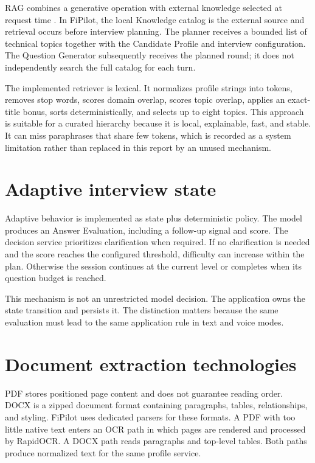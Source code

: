 RAG combines a generative operation with external knowledge selected at request time \cite{lewis2020rag}. In FiPilot, the local Knowledge catalog is the external source and retrieval occurs before interview planning. The planner receives a bounded list of technical topics together with the Candidate Profile and interview configuration. The Question Generator subsequently receives the planned round; it does not independently search the full catalog for each turn.

The implemented retriever is lexical. It normalizes profile strings into tokens, removes stop words, scores domain overlap, scores topic overlap, applies an exact-title bonus, sorts deterministically, and selects up to eight topics. This approach is suitable for a curated hierarchy because it is local, explainable, fast, and stable. It can miss paraphrases that share few tokens, which is recorded as a system limitation rather than replaced in this report by an unused mechanism.

\section{Adaptive interview state}

Adaptive behavior is implemented as state plus deterministic policy. The model produces an Answer Evaluation, including a follow-up signal and score. The decision service prioritizes clarification when required. If no clarification is needed and the score reaches the configured threshold, difficulty can increase within the plan. Otherwise the session continues at the current level or completes when its question budget is reached.

This mechanism is not an unrestricted model decision. The application owns the state transition and persists it. The distinction matters because the same evaluation must lead to the same application rule in text and voice modes.

\section{Document extraction technologies}

PDF stores positioned page content and does not guarantee reading order. DOCX is a zipped document format containing paragraphs, tables, relationships, and styling. FiPilot uses dedicated parsers for these formats. A PDF with too little native text enters an OCR path in which pages are rendered and processed by RapidOCR. A DOCX path reads paragraphs and top-level tables. Both paths produce normalized text for the same profile service.

